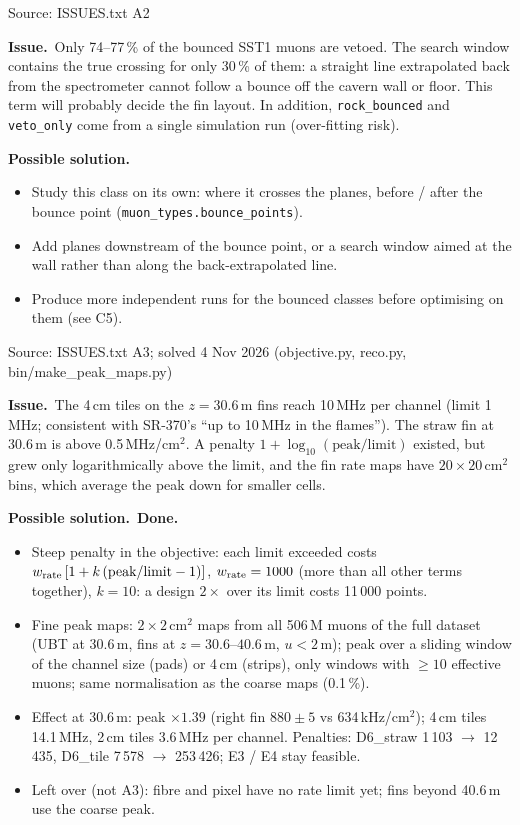 \documentclass[10pt,a4paper]{article}
\newcommand{\st}[1]{\textbf{#1}}
\newcommand{\stOPEN}{\textcolor{shorange}{\st{OPEN}}}
\newcommand{\stSOLVED}{\textcolor{okgreen}{\st{SOLVED}}}
\newenvironment{issue}[5]{%
  \begin{tcolorbox}[breakable,colback=white,colframe=cernblue,boxrule=0.6pt,arc=1.5mm,
    left=6pt,right=6pt,top=4pt,bottom=4pt,
    title={\textbf{#1}\quad #2\hfill{\normalfont\small priority #3\quad\colorbox{white}{#4}}},
    coltitle=white,colbacktitle=cernblue,fonttitle=\normalsize]
  {\color{greytxt}\footnotesize Source: #5}\par\smallskip}{\end{tcolorbox}\vspace{2pt}}
\newcommand{\prob}{\par\noindent\textbf{\color{cernblue}Issue.}\ }
\newcommand{\sol}{\par\smallskip\noindent\textbf{\color{shorange}Possible solution.}\ }
\begin{document}
\begin{issue}{A2}{Bounced muons: the veto barely sees them}{A}{\stOPEN}{ISSUES.txt A2}
\prob Only 74--77\,\% of the bounced SST1 muons are vetoed. The search window contains the true crossing for only
30\,\% of them: a straight line extrapolated back from the spectrometer cannot follow a bounce off the cavern wall
or floor. This term will probably decide the fin layout. In addition, \texttt{rock\_bounced} and \texttt{veto\_only}
come from a single simulation run (over-fitting risk).
\sol
\begin{itemize}
\item Study this class on its own: where it crosses the planes, before / after the bounce point
      (\texttt{muon\_types.bounce\_points}).
\item Add planes downstream of the bounce point, or a search window aimed at the wall rather than along the
      back-extrapolated line.
\item Produce more independent runs for the bounced classes before optimising on them (see C5).
\end{itemize}
\end{issue}

\begin{issue}{A3}{Rate limits are reported, not enforced}{A}{\stSOLVED}{ISSUES.txt A3; solved 4 Nov 2026 (objective.py, reco.py, bin/make\_peak\_maps.py)}
\prob The 4\,cm tiles on the $z=30.6$\,m fins reach 10\,MHz per channel (limit 1\,MHz; consistent with SR-370's
``up to 10\,MHz in the flames''). The straw fin at 30.6\,m is above 0.5\,MHz/cm$^2$. A penalty $1+\log_{10}(\text{peak}/\text{limit})$
existed, but grew only logarithmically above the limit, and the fin rate maps have $20\times20$\,cm$^2$ bins, which
average the peak down for smaller cells.
\sol \textbf{Done.}
\begin{itemize}
\item Steep penalty in the objective: each limit exceeded costs $w_{\rm rate}\,[1+k\,(\text{peak}/\text{limit}-1)]$,
      $w_{\rm rate}=1000$ (more than all other terms together), $k=10$: a design $2\times$ over its limit costs 11\,000 points.
\item Fine peak maps: $2\times2$\,cm$^2$ maps from all 506\,M muons of the full dataset (UBT at 30.6\,m, fins at
      $z=30.6$--$40.6$\,m, $u<2$\,m); peak over a sliding window of the channel size (pads) or 4\,cm (strips), only windows
      with $\ge10$ effective muons; same normalisation as the coarse maps (0.1\,\%).
\item Effect at 30.6\,m: peak $\times1.39$ (right fin $880\pm5$ vs 634\,kHz/cm$^2$); 4\,cm tiles 14.1\,MHz, 2\,cm tiles
      3.6\,MHz per channel. Penalties: D6\_straw 1\,103 $\to$ 12\,435, D6\_tile 7\,578 $\to$ 253\,426; E3 / E4 stay feasible.
\item Left over (not A3): fibre and pixel have no rate limit yet; fins beyond 40.6\,m use the coarse peak.
\end{itemize}
\end{issue}
\end{document}
